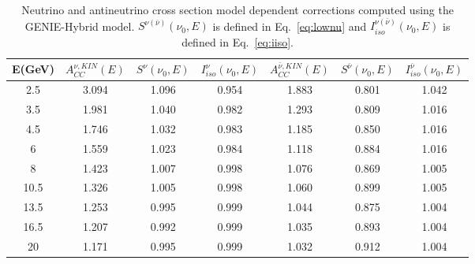 \documentclass[aps,preprint,showpacs,superscriptaddress,linenumbers,nofootinbib,prd,12pt]{revtex4}
\begin{document}
\begin{table}[ht]
\begin{centering}
\begin{tabular}{|c|c c c|c c c|}
\hline\hline
E(GeV) &$A^{\nu,KIN}_{CC}(E)$ & $S^{\nu}(\nu_{0}, E)$ &  $I^{\nu}_{iso}(\nu_{0}, E)$&$A^{\bar{\nu},KIN}_{CC}(E)$ & $S^{\bar{\nu}}(\nu_{0}, E)$ &  $I^{\bar{\nu}}_{iso}(\nu_{0}, E)$  \\
\hline
2.5 & 3.094&  1.096  &0.954 & 1.883&  0.801 &1.042\\  \hline
3.5 & 1.981&  1.040  &0.982 & 1.293&  0.809  &1.016\\
4.5 & 1.746&  1.032  &0.983 & 1.185&  0.850  &1.016\\
6 & 1.559&  1.023  &0.984 & 1.118&  0.884  &1.016\\  \hline
8 & 1.423&  1.007  &0.998& 1.076&  0.869  &1.005\\
10.5 & 1.326&  1.005  &0.998 &1.060&  0.899  &1.005\\ \hline
13.5 & 1.253&  0.995  &0.999 & 1.044&  0.875  &1.004\\  
16.5 & 1.207&  0.992  &0.999&1.035&  0.893  &1.004\\
20 & 1.171&  0.995  &0.999&1.032&  0.912  &1.004\\
\hline\hline
\end{tabular}
\caption{Neutrino and antineutrino cross section model dependent corrections computed using the GENIE-Hybrid model. $S^{\nu(\bar{\nu})}(\nu_{0}, E)$ is defined in Eq.~\eqref{eq:lownu} and $I^{\nu(\bar{\nu})}_{iso}(\nu_{0}, E)$ is defined in Eq.~\eqref{eq:iiso}.}
\label{tab:corrections_GENIE_nu}
\end{centering}
\end{table}
\end{document}
